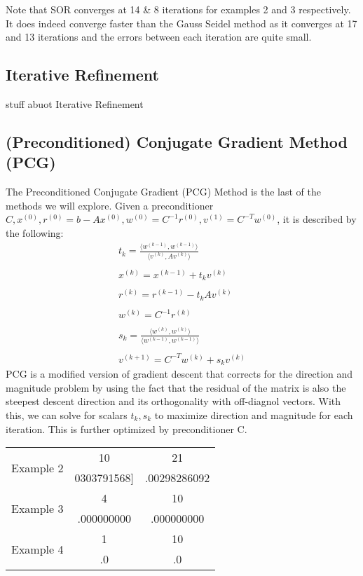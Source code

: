 \documentclass[11pt]{article}	%
\begin{document}
Note that SOR converges at 14 \& 8 iterations for examples 2 and 3 respectively. It does indeed converge faster than the Gauss Seidel method as it converges at 17 and 13 iterations and the errors between each iteration are quite small.

\subsection{Iterative Refinement}
stuff abuot Iterative Refinement

\subsection{(Preconditioned) Conjugate Gradient Method (PCG)}
The Preconditioned Conjugate Gradient (PCG) Method is the last of the methods we will explore. Given a preconditioner $C, x^{(0)}, r^{(0)} = b - Ax^{(0)}, w^{(0)} = C^{-1}r^{(0)}, v^{(1)} = C^{-T}w^{(0)}$, it is described by the following:
\begin{align*}\label{eq:precondition-conj-grad-eq-1}
    t_k = \frac{\langle w^{(k-1)}, w^{(k-1)}\rangle}{\langle v^{(k)}, Av^{(k)}\rangle} \\\\
    x^{(k)} = x^{(k-1)} + t_kv^{(k)} \\\\
    r^{(k)} = r^{(k-1)} - t_kAv^{(k)} \\\\
    w^{(k)} = C^{-1}r^{(k)} \\\\
    s_k = \frac{\langle w^{(k)}, w^{(k)}\rangle}{\langle w^{(k-1)}, w^{(k-1)}\rangle} \\\\
    v^{(k+1)} = C^{-T}w^{(k)} + s_kv^{(k)}
\end{align*}
PCG is a modified version of gradient descent that corrects for the direction and magnitude problem by using the fact that the residual of the matrix is also the steepest descent direction and its orthogonality with off-diagnol vectors. With this, we can solve for scalars $t_k, s_k$ to maximize direction and magnitude for each iteration. This is further optimized by preconditioner C.

\begin{center}
    \begin{tabular}{||c|c|c||}
        \hline
        \multirow{2}{5em}{Example 2} & 10 & 21 \\ [.25em]
        & 0303791568] & .00298286092\\ [.25em]
        \hline\hline
        \multirow{2}{5em}{Example 3} & 4 & 10 \\ [.25em]
        & .000000000 & .000000000 \\ [.25em]
        \hline
        \multirow{2}{5em}{Example 4} & 1 & 10 \\ [.25em]
        & .0 & .0 \\ [.25em]
        \hline
    \end{tabular}
\end{center}
\end{document}
